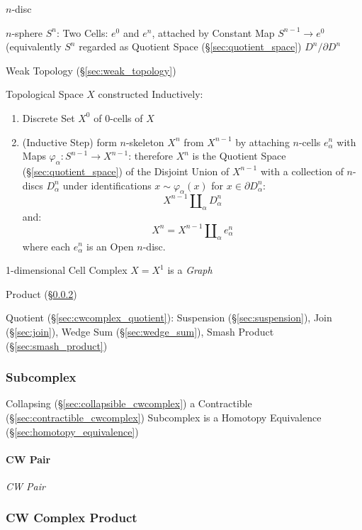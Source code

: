 $n$-disc

$n$-sphere $S^n$: Two Cells: $e^0$ and $e^n$, attached by Constant Map
$S^{n-1} \rightarrow e^0$ (equivalently $S^n$ regarded as Quotient
Space (\S\ref{sec:quotient_space}) $D^n/ \partial D^n$

Weak Topology (\S\ref{sec:weak_topology})

Topological Space $X$ constructed Inductively: \cite{hatcher02}
\begin{enumerate}
  \item Discrete Set $X^0$ of $0$-cells of $X$
  \item (Inductive Step) form $n$-skeleton $X^n$ from $X^{n-1}$ by
    attaching $n$-cells $e^n_\alpha$ with Maps $\varphi_\alpha :
    S^{n-1} \rightarrow X^{n-1}$: therefore $X^n$ is the Quotient
    Space (\S\ref{sec:quotient_space}) of the Disjoint Union of
    $X^{n-1}$ with a collection of $n$-discs $D^n_\alpha$ under
    identifications $x \sim \varphi_\alpha(x)$ for $x \in \partial
    D^n_\alpha$:
    \[
      X^{n-1}\amalg_\alpha D^n_\alpha
    \]
    and:
    \[
      X^n = X^{n-1}\amalg_\alpha e^n_\alpha
    \]
    where each $e^n_\alpha$ is an Open $n$-disc.
\end{enumerate}

1-dimensional Cell Complex $X = X^1$ is a \emph{Graph}

Product (\S\ref{sec:cwcomplex_product})

Quotient (\S\ref{sec:cwcomplex_quotient}): Suspension
(\S\ref{sec:suspension}), Join (\S\ref{sec:join}), Wedge Sum
(\S\ref{sec:wedge_sum}), Smash Product (\S\ref{sec:smash_product})



\subsubsection{Subcomplex}\label{sec:subcomplex}

Collapsing (\S\ref{sec:collapsible_cwcomplex}) a Contractible
(\S\ref{sec:contractible_cwcomplex}) Subcomplex is a Homotopy
Equivalence (\S\ref{sec:homotopy_equivalence})



\paragraph{CW Pair}\label{sec:cw_pair}\hfill

\emph{CW Pair}



\subsubsection{CW Complex Product}\label{sec:cwcomplex_product}

